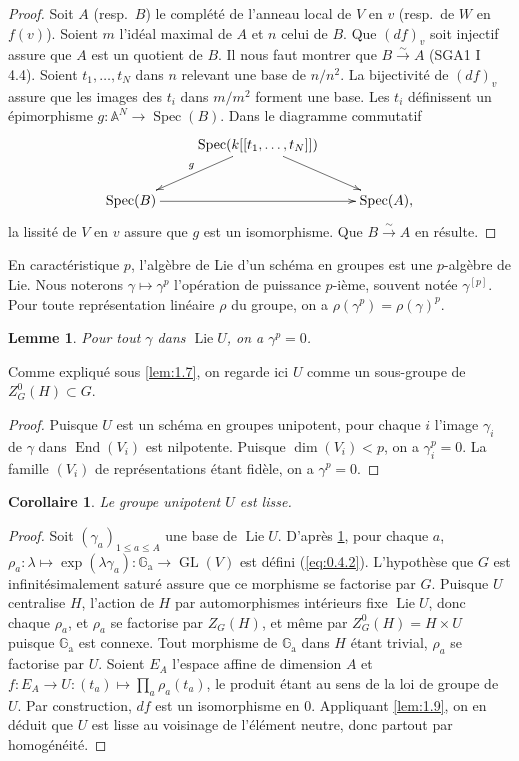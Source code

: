 \documentclass[11pt,a4paper]{article}
\theoremstyle{plain}
\newtheorem{lemma}[theorem]{Lemme}
\newtheorem{corollary}[theorem]{Corollaire}
\theoremstyle{definition}
\DeclareMathOperator{\Spec}{Spec}
\DeclareMathOperator{\End}{End}
\DeclareMathOperator{\Lie}{Lie}
\DeclareMathOperator{\GL}{GL}
\newcommand{\Ga}{\mathbb{G}_\mathrm{a}}
\begin{document}
\begin{proof}
Soit $A$ (resp.\ $B$) le compl\'et\'e de l'anneau local de $V$ en $v$ (resp.\ de $W$ en $f(v)$). Soient $m$ l'id\'eal maximal de $A$ et $n$ celui de $B$. Que $(df)_v$ soit injectif assure que $A$ est un quotient de $B$. Il nous faut montrer que $B \xrightarrow{\sim} A$ (SGA1 I 4.4). Soient $t_1,\ldots,t_N$ dans $n$ relevant une base de $n/n^2$. La bijectivit\'e de $(df)_v$ assure que les images des $t_i$ dans $m/m^2$ forment une base. Les $t_i$ d\'efinissent un \'epimorphisme $g: \mathbb{A}^N \to \Spec(B)$. Dans le diagramme commutatif
\[
\xymatrix{
& \Spec(k[[t_1,\ldots,t_N]]) \ar[dl]_{g} \ar[dr] & \\
\Spec(B) \ar[rr] & & \Spec(A),
}
\]
la lissit\'e de $V$ en $v$ assure que $g$ est un isomorphisme. Que $B \xrightarrow{\sim} A$ en r\'esulte.
\end{proof}

En caract\'eristique $p$, l'alg\`ebre de Lie d'un sch\'ema en groupes est une $p$-alg\`ebre de Lie. Nous noterons $\gamma \mapsto \gamma^p$ l'op\'eration de puissance $p$-i\`eme, souvent not\'ee $\gamma^{[p]}$. Pour toute repr\'esentation lin\'eaire $\rho$ du groupe, on a $\rho(\gamma^p) = \rho(\gamma)^p$.

\begin{lemma}\label{lem:1.10}
Pour tout $\gamma$ dans $\Lie U$, on a $\gamma^p = 0$.
\end{lemma}

Comme expliqu\'e sous \ref{lem:1.7}, on regarde ici $U$ comme un sous-groupe de $Z^0_G(H) \subset G$.

\begin{proof}
Puisque $U$ est un sch\'ema en groupes unipotent, pour chaque $i$ l'image $\gamma_i$ de $\gamma$ dans $\End(V_i)$ est nilpotente. Puisque $\dim(V_i) < p$, on a $\gamma_i^p = 0$. La famille $(V_i)$ de repr\'esentations \'etant fid\`ele, on a $\gamma^p = 0$.
\end{proof}

\begin{corollary}\label{cor:1.11}
Le groupe unipotent $U$ est lisse.
\end{corollary}

\begin{proof}
Soit $(\gamma_a)_{1 \leq a \leq A}$ une base de $\Lie U$. D'apr\`es \ref{lem:1.10}, pour chaque $a$, $\rho_a: \lambda \mapsto \exp(\lambda\gamma_a): \Ga \to \GL(V)$ est d\'efini (\ref{eq:0.4.2}). L'hypoth\`ese que $G$ est infinit\'esimalement satur\'e assure que ce morphisme se factorise par $G$. Puisque $U$ centralise $H$, l'action de $H$ par automorphismes int\'erieurs fixe $\Lie U$, donc chaque $\rho_a$, et $\rho_a$ se factorise par $Z_G(H)$, et m\^eme par $Z^0_G(H) = H \times U$ puisque $\Ga$ est connexe. Tout morphisme de $\Ga$ dans $H$ \'etant trivial, $\rho_a$ se factorise par $U$. Soient $E_A$ l'espace affine de dimension $A$ et $f: E_A \to U: (t_a) \mapsto \prod_a \rho_a(t_a)$, le produit \'etant au sens de la loi de groupe de $U$. Par construction, $df$ est un isomorphisme en $0$. Appliquant \ref{lem:1.9}, on en d\'eduit que $U$ est lisse au voisinage de l'\'el\'ement neutre, donc partout par homog\'en\'eit\'e.
\end{proof}
\end{document}
